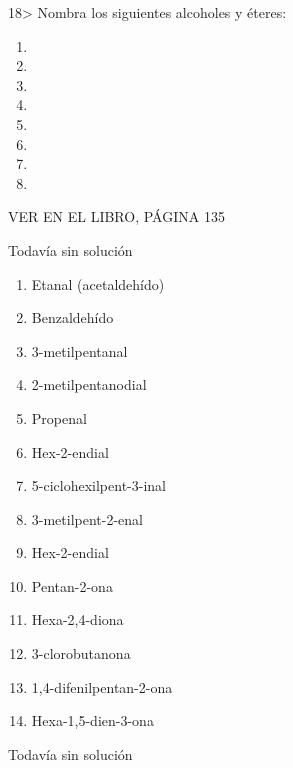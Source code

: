\documentclass{article}
\begin{document}
\begin{exercise}
  18> Nombra los siguientes alcoholes y éteres:
  \begin{enumerate}
    \item {}
    \item {}
    \item {}
    \item {}
    \item {}
    \item {}
    \item {}
    \item {}
  \end{enumerate}
  VER EN EL LIBRO, PÁGINA 135
\end{exercise}

\begin{solution}[print=false]
  Todavía sin solución
\end{solution}


\begin{exercise}
  \begin{enumerate}
    \item Etanal (acetaldehído)
    \item Benzaldehído
    \item 3-metilpentanal
    \item 2-metilpentanodial
    \item Propenal
    \item Hex-2-endial
    \item 5-ciclohexilpent-3-inal
    \item 3-metilpent-2-enal
    \item Hex-2-endial
    \item Pentan-2-ona
    \item Hexa-2,4-diona
    \item 3-clorobutanona
    \item 1,4-difenilpentan-2-ona
    \item Hexa-1,5-dien-3-ona
  \end{enumerate}
\end{exercise}

\begin{solution}[print=false]
  Todavía sin solución
\end{solution}
\end{document}
